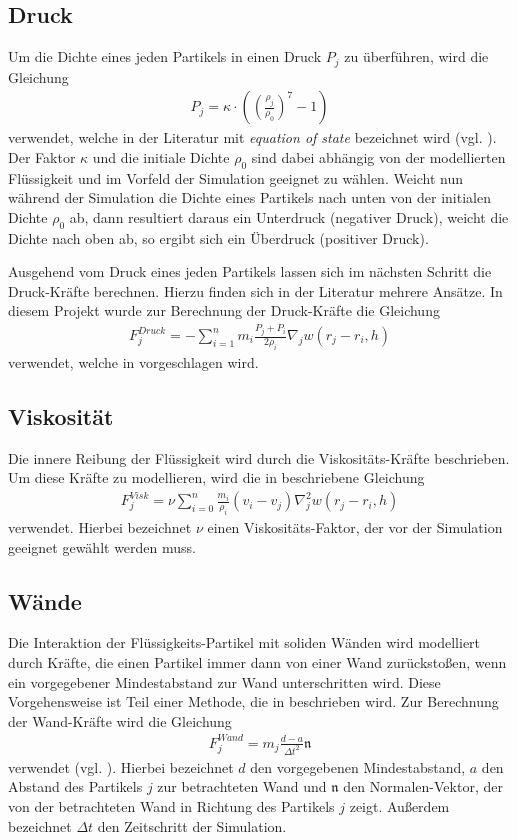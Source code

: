 \subsection*{Druck}
Um die Dichte eines jeden Partikels in einen Druck $P_j$ zu überführen, wird die Gleichung
\begin{align}\label{eos}
P_j = \kappa\cdot\left(\left(\frac{\rho_j}{\rho_0}\right)^7 - 1\right)
\end{align}
verwendet, welche in der Literatur mit \emph{equation of state} bezeichnet wird (vgl. \cite[S. 401]{FlowSPH}). Der Faktor $\kappa$ und die initiale Dichte $\rho_0$ sind dabei abhängig von der modellierten Flüssigkeit und im Vorfeld der Simulation geeignet zu wählen. Weicht nun während der Simulation die Dichte eines Partikels nach unten von der initialen Dichte $\rho_0$ ab, dann resultiert daraus ein Unterdruck (negativer Druck), weicht die Dichte nach oben ab, so ergibt sich ein Überdruck (positiver Druck).
\medskip

\noindent Ausgehend vom Druck eines jeden Partikels lassen sich im nächsten Schritt die Druck-Kräfte berechnen. Hierzu finden sich in der Literatur mehrere Ansätze. In diesem Projekt wurde zur Berechnung der Druck-Kräfte die Gleichung
\begin{align}\label{pressure}
F_j^{Druck} = -\sum_{i=1}^n m_i \frac{P_j + P_i}{2\rho_i} \nabla_j w(r_j - r_i, h)
\end{align}
verwendet, welche in \cite[S. 156]{FluidSim} vorgeschlagen wird.

\subsection*{Viskosität}
Die innere Reibung der Flüssigkeit wird durch die Viskositäts-Kräfte beschrieben. Um diese Kräfte zu modellieren, wird die in \cite[S. 156]{FluidSim} beschriebene Gleichung
\begin{align}\label{viscosity}
F_j^{Visk} = \nu \sum_{i=0}^n \frac{m_i}{\rho_i} (v_i - v_j) \nabla_j^2 w(r_j - r_i, h)
\end{align}
verwendet. Hierbei bezeichnet $\nu$ einen Viskositäts-Faktor, der vor der Simula\-tion geeignet gewählt werden muss.

\subsection*{Wände}
Die Interaktion der Flüssigkeits-Partikel mit soliden Wänden wird modelliert durch Kräfte, die einen Partikel immer dann von einer Wand zurückstoßen, wenn ein vorgegebener Mindestabstand zur Wand unterschritten wird. Diese Vorgehensweise ist Teil einer Methode, die in \cite{BoundarySPH} beschrieben wird. Zur Berechnung der Wand-Kräfte wird die Gleichung
\begin{align}\label{boundary}
F_j^{Wand} = m_j\frac{d - a}{{\Delta t}^2} \mathfrak{n}
\end{align}
verwendet (vgl. \cite[Gleichung 26]{BoundarySPH}). Hierbei bezeichnet $d$ den vorgegebenen Mindestabstand, $a$ den Abstand des Partikels $j$ zur betrachteten Wand und $\mathfrak{n}$ den Normalen-Vektor, der von der betrachteten Wand in Richtung des Partikels $j$ zeigt. Außerdem bezeichnet $\Delta t$ den Zeitschritt der Simulation.

